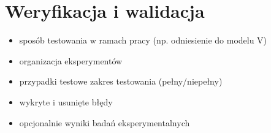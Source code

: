 \documentclass[a4paper,twoside,12pt]{book}
\begin{document}
%      




%
%
%
\chapter{Weryfikacja i walidacja}
\label{ch:06}
\begin{itemize}
\item sposób testowania w ramach pracy (np. odniesienie do modelu V)
\item organizacja eksperymentów
\item przypadki testowe zakres testowania (pełny/niepełny)
\item wykryte i usunięte błędy
\item opcjonalnie wyniki badań eksperymentalnych
\end{itemize}
\end{document}
